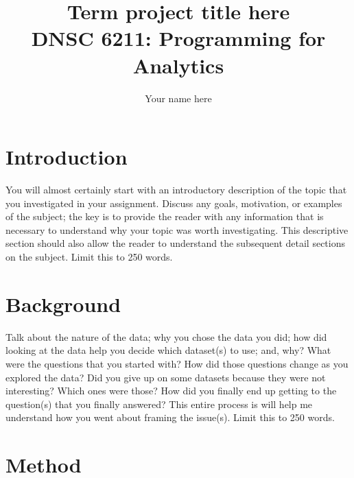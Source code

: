 \documentclass{article}
\title{Term project title here  \\ \small{DNSC 6211: Programming for Analytics}}
\author{Your name here}
\date{}
\begin{document}
\maketitle


\pagebreak
\tableofcontents


\pagebreak

%
%
\section{Introduction}
\label{introduction}

You will almost certainly start with an introductory description of the topic that you investigated in your assignment.  Discuss any goals, motivation, or examples of the subject; the key is to provide the reader with any information that is necessary to understand why your topic was worth investigating.  This descriptive section should also allow the reader to understand the subsequent detail sections on the subject. Limit this to 250 words.

\section{Background}

Talk about the nature of the data; why you chose the data you did; how did looking at the data help you decide which dataset(s) to use; and, why? What were the questions that you started with? How did those questions change as you explored the data? Did you give up on some datasets because they were not interesting? Which ones were those? How did you finally end up getting to the question(s) that you finally answered? This entire process is will help me understand how you went about framing the issue(s). Limit this to 250 words.

\section{Method}
\end{document}
